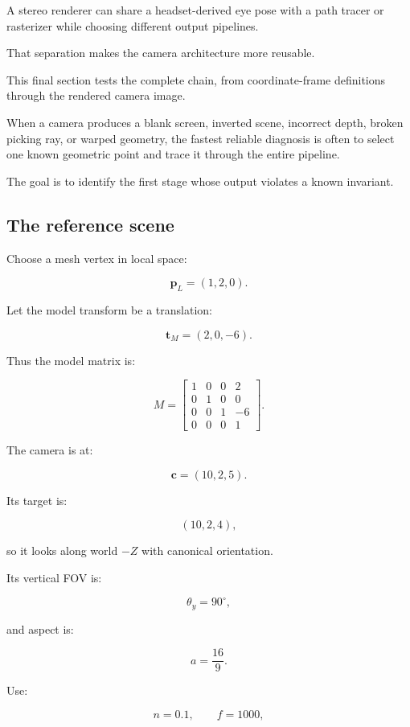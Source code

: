 A stereo renderer can share a headset-derived eye pose with a path tracer or rasterizer while choosing different output pipelines.

That separation makes the camera architecture more reusable.

This final section tests the complete chain, from coordinate-frame definitions through the rendered camera image.

When a camera produces a blank screen, inverted scene, incorrect depth, broken picking ray, or warped geometry, the fastest reliable diagnosis is often to select one known geometric point and trace it through the entire pipeline.

The goal is to identify the first stage whose output violates a known invariant.

\subsection{The reference scene}\label{02-foundations-ii-ch037-the-reference-scene}

\hypertarget{02-foundations-ii-ch037-the-reference-scene}{}

Choose a mesh vertex in local space:

\[ \boxed{ \mathbf p_L=(1,2,0). } \]

Let the model transform be a translation:

\[ \boxed{ \mathbf t_M=(2,0,-6). } \]

Thus the model matrix is:

\[ M= \begin{bmatrix} 1&0&0&2\\ 0&1&0&0\\ 0&0&1&-6\\ 0&0&0&1 \end{bmatrix}. \]

The camera is at:

\[ \boxed{ \mathbf c=(10,2,5). } \]

Its target is:

\[ (10,2,4), \]

so it looks along world \(-Z\) with canonical orientation.

Its vertical FOV is:

\[ \theta_y=90^\circ, \]

and aspect is:

\[ a=\frac{16}{9}. \]

Use:

\[ n=0.1,\qquad f=1000, \]

